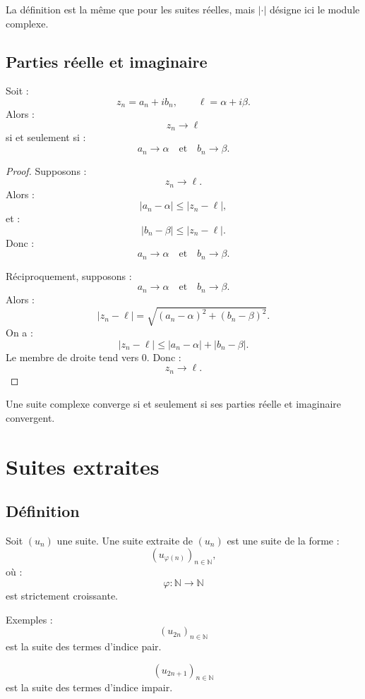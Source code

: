 \documentclass[11pt,a4paper]{article}
\newcommand{\N}{\mathbb N}
\newcommand{\abs}[1]{\left|#1\right|}
\begin{document}
La définition est la même que pour les suites réelles, mais \(\abs{\cdot}\) désigne ici le module complexe.

\subsection{Parties réelle et imaginaire}

\begin{theorembox}
Soit :
\[
z_n=a_n+ib_n,
\qquad
\ell=\alpha+i\beta.
\]
Alors :
\[
z_n\to\ell
\]
si et seulement si :
\[
a_n\to\alpha
\quad\text{et}\quad
b_n\to\beta.
\]
\end{theorembox}

\begin{proof}
Supposons :
\[
z_n\to\ell.
\]
Alors :
\[
\abs{a_n-\alpha}\leq \abs{z_n-\ell},
\]
et :
\[
\abs{b_n-\beta}\leq \abs{z_n-\ell}.
\]
Donc :
\[
a_n\to\alpha
\quad\text{et}\quad
b_n\to\beta.
\]

Réciproquement, supposons :
\[
a_n\to\alpha
\quad\text{et}\quad
b_n\to\beta.
\]
Alors :
\[
\abs{z_n-\ell}
=
\sqrt{(a_n-\alpha)^2+(b_n-\beta)^2}.
\]
On a :
\[
\abs{z_n-\ell}
\leq
\abs{a_n-\alpha}+\abs{b_n-\beta}.
\]
Le membre de droite tend vers \(0\).  
Donc :
\[
z_n\to\ell.
\]
\end{proof}

\begin{retenirbox}
Une suite complexe converge si et seulement si ses parties réelle et imaginaire convergent.
\end{retenirbox}

\section{Suites extraites}

\subsection{Définition}

\begin{definitionbox}
Soit \((u_n)\) une suite.  
Une suite extraite de \((u_n)\) est une suite de la forme :
\[
(u_{\varphi(n)})_{n\in\N},
\]
où :
\[
\varphi:\N\to\N
\]
est strictement croissante.
\end{definitionbox}

Exemples :
\[
(u_{2n})_{n\in\N}
\]
est la suite des termes d'indice pair.

\[
(u_{2n+1})_{n\in\N}
\]
est la suite des termes d'indice impair.
\end{document}
